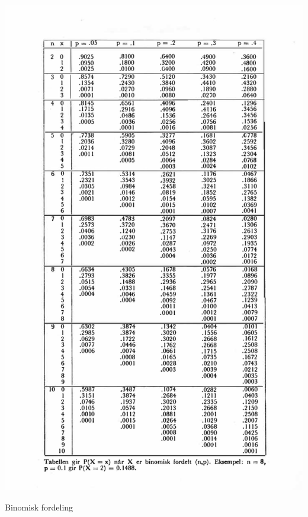 \begin{table}[H]
\centering
  \includegraphics[scale=1.0]{figurer/Tabell_2a_Binomisk_fordeling.pdf}
 \caption{Binomisk fordeling}
 \label{tab:Binomisk_fordeling} %
\end{table}


